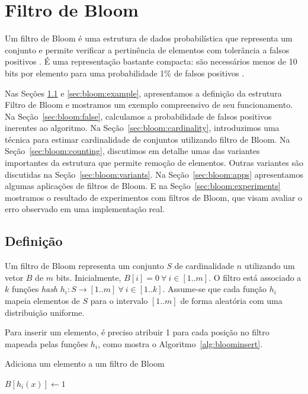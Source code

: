 \section{Filtro de Bloom}\label{sec:bloom}

Um filtro de Bloom é uma estrutura de dados probabilística que representa um conjunto e permite verificar a pertinência de elementos com tolerância a falsos positivos \cite{bloom1970space}. É uma representação bastante compacta: são necessários menos de 10 bits por elemento para uma probabilidade 1\% de falsos positivos \cite{bonomi2006improved}. 

Nas Seções \ref{sec:bloom:def} e \ref{sec:bloom:example}, apresentamos a definição da estrutura Filtro de Bloom e mostramos um exemplo compreensivo de seu funcionamento. Na Seção~\ref{sec:bloom:false}, calculamos a probabilidade de falsos positivos inerentes ao algoritmo. Na Seção~\ref{sec:bloom:cardinality}, introduzimos uma técnica para estimar cardinalidade de conjuntos utilizando filtro de Bloom. Na Seção~\ref{sec:bloom:counting}, discutimos em detalhe umas das variantes importantes da estrutura que permite remoção de elementos. Outras variantes são discutidas na Seção~\ref{sec:bloom:variants}. Na Seção~\ref{sec:bloom:apps} apresentamos algumas aplicações de filtros de Bloom. E na Seção~\ref{sec:bloom:experiments} mostramos o resultado de experimentos com filtros de Bloom, que visam avaliar o erro observado em uma implementação real.

\subsection{Definição}\label{sec:bloom:def}

Um filtro de Bloom representa um conjunto $S$ de cardinalidade $n$ utilizando um vetor $B$ de $m$ bits. Inicialmente, $B[i] = 0\ \forall\ i \in [1..m]$. O filtro está associado a $k$ funções \emph{hash} $h_i : S \rightarrow [1..m]\ \forall\ i \in [1..k]$. Assume-se que cada função $h_i$ mapeia elementos de $S$ para o intervalo $[1..m]$ de forma aleatória com uma distribuição uniforme.

Para inserir um elemento, é preciso atribuir 1 para cada posição no filtro mapeada pelas funções $h_i$, como mostra o Algoritmo~\ref{alg:bloominsert}.

\begin{algorithm}
\linespread{1}\selectfont
\caption{Adiciona um elemento a um filtro de Bloom}
\label{alg:bloominsert}
\begin{algorithmic}[1]
        \State $B[h_i(x)] \gets 1$
	\EndFor
\EndProcedure
\end{algorithmic}
\end{algorithm}

